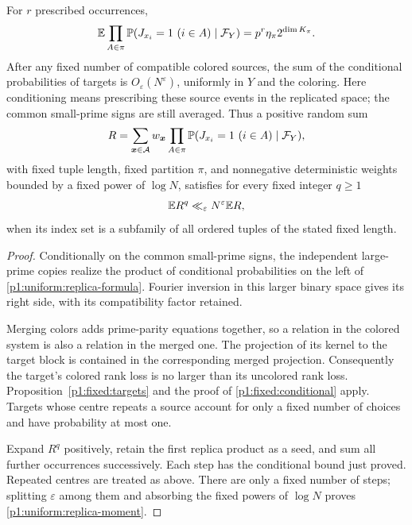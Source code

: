 \begin{proposition}
\label{p1:uniform:replicas}
For \(r\) prescribed occurrences,
\begin{equation}
 \E\prod_{A\in\pi}
     \P(J_{x_i}=1\ (i\in A)\mid\mathcal F_Y)
       =p^r\eta_\pi2^{\dim K_\pi}.
 \label{p1:uniform:replica-formula}
\end{equation}
After any fixed number of compatible colored
sources, the sum of the conditional probabilities
of targets is \(O_\varepsilon(N^\varepsilon)\),
uniformly in \(Y\) and the coloring.
Here conditioning means prescribing these source events
in the replicated space; the common small-prime signs
are still averaged. Thus a positive random sum
\[
 R=\sum_{\boldsymbol x\in\mathcal A}w_{\boldsymbol x}
       \prod_{A\in\pi}
          \P(J_{x_i}=1\ (i\in A)\mid\mathcal F_Y),
\]
with fixed tuple length, fixed partition \(\pi\), and
nonnegative deterministic weights bounded by a fixed
power of \(\log N\),
satisfies for every fixed integer \(q\ge1\)
\begin{equation}
 \E R^q\ll_\varepsilon N^\varepsilon\E R,
 \label{p1:uniform:replica-moment}
\end{equation}
when its index set is a subfamily of all ordered
tuples of the stated fixed length.
\end{proposition}

\begin{proof}
Conditionally on the common small-prime signs,
the independent large-prime copies realize the
product of conditional probabilities on the left
of \eqref{p1:uniform:replica-formula}.
Fourier inversion in this larger binary space
gives its right side, with its compatibility
factor retained.

Merging colors adds prime-parity equations
together, so a relation in the colored system
is also a relation in the merged one. The
projection of its kernel to the target block
is contained in the corresponding merged
projection. Consequently the target's colored
rank loss is no larger than its uncolored rank
loss. Proposition~\ref{p1:fixed:targets} and the
proof of \eqref{p1:fixed:conditional} apply.
Targets whose centre repeats a source account
for only a fixed number of choices and have
probability at most one.

Expand \(R^q\) positively, retain the first
replica product as a seed, and sum all further
occurrences successively. Each step has the
conditional bound just proved. Repeated centres
are treated as above. There are only a fixed
number of steps; splitting \(\varepsilon\)
among them and absorbing the fixed powers of
\(\log N\) proves \eqref{p1:uniform:replica-moment}.
\end{proof}

